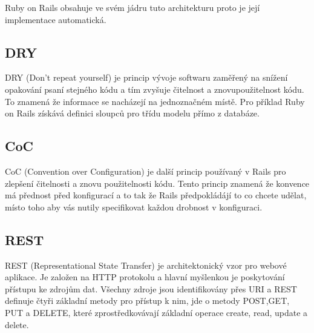 Ruby on Rails obsahuje ve svém jádru tuto architekturu proto je její implementace automatická.

\subsection{DRY}
DRY (Don’t repeat yourself) je princip vývoje softwaru zaměřený na snížení opakování psaní stejného kódu a tím zvyšuje čitelnost a znovupoužitelnost kódu. To znamená že informace se nacházejí na jednoznačném místě. Pro příklad Ruby on Rails získává definici sloupců pro třídu modelu přímo z databáze.  

\subsection{CoC}
CoC (Convention over Configuration) je další princip používaný v Rails pro zlepšení čitelnosti a znovu použitelnosti kódu. Tento princip znamená že konvence má přednost před konfigurací a to tak že Rails předpokládájí to co chcete udělat, místo toho aby vás nutily specifikovat každou drobnost v konfiguraci. 

\subsection{REST}
REST (Representational State Transfer) je architektonický vzor pro webové aplikace. Je založen na HTTP protokolu a hlavní myšlenkou je poskytování přístupu ke zdrojům dat. Všechny zdroje jsou identifikovány přes URI a REST definuje čtyři základní metody pro přístup k nim, jde o metody POST,GET, PUT a DELETE, které zprostředkovávají základní operace create, read, update a delete.
